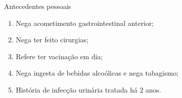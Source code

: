 \begin{frame}{Antecedentes pessoais}
\begin{enumerate}
    \item Nega acometimento gastrointestinal anterior;
    \item Nega ter feito cirurgias;
    \item Refere ter vacinação em dia; 
    \item Nega ingesta de bebidas alcoólicas e nega tabagismo; 
    \item História de infecção urinária tratada há 2 anos.
\end{enumerate}{}
\end{frame}